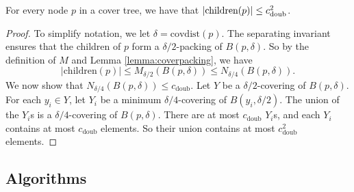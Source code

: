 \documentclass[../main.tex]{subfiles}
\newcommand{\doubnum}{c_\text{doub}}
\newcommand{\p}{\ensuremath p}
\newcommand{\mkfunction}[1]{\ensuremath{\text{{#1}}}}
\newcommand{\children}[1]   {\mkfunction{children}({#1})}
\newcommand{\covdist}[1]    {\mkfunction{covdist}({#1})}
\begin{document}

\begin{lemma}
    \label{lemma:children}
    For every node $p$ in a cover tree, we have that
    $|\children\p| \le \doubnum^2$.
\end{lemma}

\begin{proof}
    To simplify notation, we let $\delta=\covdist{p}$.
    The separating invariant ensures that the children of $p$ form a $\delta/2$-packing of $B(p,\delta)$.
    So by the definition of $M$ and Lemma \ref{lemma:coverpacking}, we have
    \begin{equation}
        |\children{p}| 
        \le M_{\delta/2}(B(p,\delta)) 
        \le N_{\delta/4}(B(p,\delta)) 
        .
    \end{equation}
    We now show that $N_{\delta/4}(B(p,\delta))\le\doubnum$.
    Let $Y$ be a $\delta/2$-covering of $B(p,\delta)$.
    For each $y_i\in Y$, let $Y_i$ be a minimum $\delta/4$-covering of $B(y_i,\delta/2)$.
    The union of the $Y_i$s is a $\delta/4$-covering of $B(p,\delta)$.
    There are at most $\doubnum$ $Y_i$s, and each $Y_i$ contains at most $\doubnum$ elements.
    So their union contains at most $\doubnum^2$ elements.
\end{proof}


\subsection{Algorithms}
\end{document}
